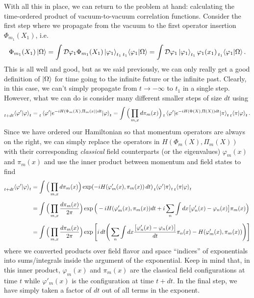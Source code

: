 \documentclass{article}
\numberwithin{equation}{subsection}
\begin{document}
With all this in place, we can return to the problem at hand: calculating the time-ordered product of vacuum-to-vacuum correlation functions. Consider the 
first step where we propagate from the vacuum to the first operator insertion $\Phi_{m_1}(X_1)$, i.e.
\begin{equation}
    \Phi_{m_1}(X_1)\ket{\Omega} = \int\mathcal{D}\varphi_1\Phi_{m_1}(X_1)\ket{\varphi_1}_{t_1}\prescript{}{t_1}{\braket{\varphi_1}{\Omega}} = \int\mathcal{D}\varphi_1\ket{\varphi_1}_{t_1}\varphi_1(x_1)\prescript{}{t_1}{\braket{\varphi_1}{\Omega}}\,.
\end{equation}
This is all well and good, but as we said previously, we can only really get a good definition of $\ket{\Omega}$ for time going to the infinite future or the infinite past. Clearly, 
in this case, we can't simply propagate from $t\to-\infty$ to $t_1$ in a single step. However, what we can do is consider many different smaller steps of size $dt$ using
\begin{equation}
    \prescript{}{t + dt}{\braket{\varphi'}{\varphi}_t} = \prescript{}{t}{\mel{\varphi'}{e^{-iH(\Phi_m(X),\Pi_m(x))dt}}{\varphi}_t} = \int \Big(\prod_{m, x}d\pi_m(x)\Big)\prescript{}{t}{\mel{\varphi'}{e^{-iH(\Phi(X),\Pi(X))dt}}{\pi}_t}\prescript{}{t}{\braket{\pi}{\varphi}_t}\,.
\end{equation}
Since we have ordered our Hamiltonian so that momentum operators are always on the right, we can simply replace the operators in $H(\Phi_m(X), \Pi_m(X))$ with their 
corresponding \textit{classical} field counterparts (or the eigenvalues) $\varphi_m(x)$ and $\pi_m(x)$ and use the inner product between momentum and field states to find
\begin{equation}\begin{split}
    \prescript{}{t + dt}{\braket{\varphi'}{\varphi}_t} &= \int \Big(\prod_{m, x}d\pi_m(x)\Big) \exp(-iH(\varphi'_m(x),\pi_m(x))\,dt)\prescript{}{t}{\braket{\varphi'}{\pi}_t}
	\prescript{}{t}{\braket{\pi}{\varphi}_t} \\[0.5em] 
    &= \int\Big(\prod_{m, x}\frac{d\pi_m(x)}{2\pi}\Big) \exp\Big(-iH(\varphi'_m(x),\pi_m(x))dt + i\sum_n\int dx\big[\varphi'_n(x) - \varphi_n(x)\big]\pi_m(x)\Big) \\[0.5em]
    &= \int\Big(\prod_{m, x}\frac{d\pi_m(x)}{2\pi}\Big) \exp\Bigg[i\,dt\Bigg(\sum_n\int dx\frac{\big[\varphi'_n(x) - \varphi_n(x)\big]}{dt}\pi_n(x) - H(\varphi'_m(x),\pi_m(x))\Bigg)\Bigg]
\end{split}\end{equation}
where we converted products over field flavor and space ``indices'' of exponentials into sums/integrals inside the argument of the exponential. Keep in mind that, 
in this inner product, $\varphi_m(x)$ and $\pi_m(x)$ are the classical field configurations at time $t$ while $\varphi'_m(x)$ is the configuration at time $t+dt$. In the final step, 
we have simply taken a factor of $dt$ out of all terms in the exponent.
\end{document}
